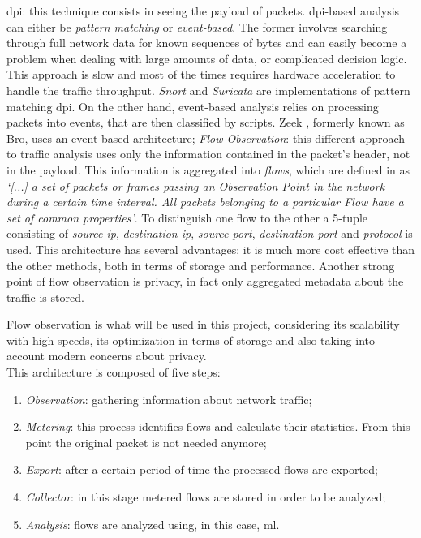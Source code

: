 \begin{itemize}
    \itemAR \gls{dpi}: this technique consists in seeing the payload of  packets. \gls{dpi}-based analysis can either be \textit{pattern matching} or \textit{event-based}. The former involves searching through full network data for known sequences of bytes and can easily become a problem when dealing with large amounts of data, or complicated decision logic. This approach is slow and most of the times requires  hardware acceleration to handle the traffic throughput. \textit{Snort} \cite{SnortWebsite} and \textit{Suricata} \cite{SuricataWebsite} are implementations of pattern matching \gls{dpi}. On the other hand, event-based analysis relies on processing packets into events, that are then classified by scripts. Zeek \cite{ZeekWebsite}, formerly known as Bro, uses an event-based architecture;
    \itemAR \textit{Flow Observation}: this different approach to traffic analysis uses only the information contained in the packet's header, not in the payload. This information is aggregated into \textit{flows}, which are defined in \cite{RFC7011} as \textit{`[...] a set of packets or frames passing an Observation Point in the network during a certain time interval. All packets belonging to a particular Flow have a set of common properties'}. To distinguish one flow to the other a 5-tuple consisting of \textit{source ip}, \textit{destination ip}, \textit{source port}, \textit{destination port} and \textit{protocol} is used. This architecture has several advantages: it is much more cost effective than the other methods, both in terms of storage and performance. Another strong point of flow observation is privacy, in fact only aggregated metadata about the traffic is stored.
\end{itemize}

\noindent Flow observation is what will be used in this project, considering its scalability with high speeds, its optimization in terms of storage and also taking into account modern concerns about privacy. \\ This architecture is composed of five steps:

\begin{enumerate}
    \item[\circled{1}] \textit{Observation}: gathering information about network traffic;
    \item[\circled{2}] \textit{Metering}: this process identifies flows and calculate their statistics. From this point the original packet is not needed anymore;
    \item[\circled{3}] \textit{Export}: after a certain period of time the processed flows are exported;
    \item[\circled{4}] \textit{Collector}: in this stage metered flows are stored in order to be analyzed;
    \item[\circled{5}] \textit{Analysis}: flows are analyzed using, in this case, \gls{ml}.
\end{enumerate}

